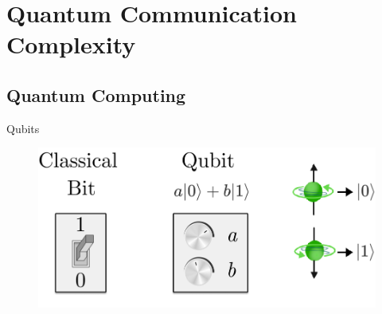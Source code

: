 \section{Quantum Communication Complexity}

\subsection{Quantum Computing}
\begin{frame}{Qubits}
    \begin{figure}
        \includegraphics[width=.8\linewidth]{pics/y8XA7Re44P-frame-27.png}
        \label{fig:my_label}
    \end{figure}
    \begin{center}
    \begin{itemize}
    \end{itemize}
    \end{center}
\end{frame}

